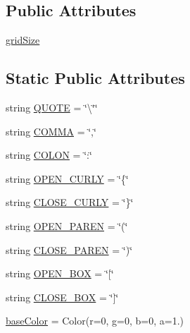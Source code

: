 \subsection*{Public Attributes}
\begin{DoxyCompactItemize}
\item 
\mbox{\hyperlink{class_bridges_1_1color__grid_1_1_color_grid_aabd8053e5acb920c28e519cd1ee69c35}{grid\+Size}}
\end{DoxyCompactItemize}
\subsection*{Static Public Attributes}
\begin{DoxyCompactItemize}
\item 
string \mbox{\hyperlink{class_bridges_1_1color__grid_1_1_color_grid_a1db881c79ab55a95c4c15dee31a1e431}{Q\+U\+O\+TE}} = \char`\"{}\textbackslash{}\char`\"{}\char`\"{}
\item 
string \mbox{\hyperlink{class_bridges_1_1color__grid_1_1_color_grid_af280f63885bffee3d3b6ecf0695844fc}{C\+O\+M\+MA}} = \char`\"{},\char`\"{}
\item 
string \mbox{\hyperlink{class_bridges_1_1color__grid_1_1_color_grid_a6185e36f338b56b33ff327afda157cf1}{C\+O\+L\+ON}} = \char`\"{}\+:\char`\"{}
\item 
string \mbox{\hyperlink{class_bridges_1_1color__grid_1_1_color_grid_a1f379a6c0e9fc4db2045e52678f15e20}{O\+P\+E\+N\+\_\+\+C\+U\+R\+LY}} = \char`\"{}\{\char`\"{}
\item 
string \mbox{\hyperlink{class_bridges_1_1color__grid_1_1_color_grid_a05c0cee0f9ca312db59a1d60e53845ba}{C\+L\+O\+S\+E\+\_\+\+C\+U\+R\+LY}} = \char`\"{}\}\char`\"{}
\item 
string \mbox{\hyperlink{class_bridges_1_1color__grid_1_1_color_grid_abde748d9ceae5339a3724b7064eee054}{O\+P\+E\+N\+\_\+\+P\+A\+R\+EN}} = \char`\"{}(\char`\"{}
\item 
string \mbox{\hyperlink{class_bridges_1_1color__grid_1_1_color_grid_afed081c42ad44319664d72567ee1b9ba}{C\+L\+O\+S\+E\+\_\+\+P\+A\+R\+EN}} = \char`\"{})\char`\"{}
\item 
string \mbox{\hyperlink{class_bridges_1_1color__grid_1_1_color_grid_a33869db1b3658c232827a2a0bc6e7170}{O\+P\+E\+N\+\_\+\+B\+OX}} = \char`\"{}\mbox{[}\char`\"{}
\item 
string \mbox{\hyperlink{class_bridges_1_1color__grid_1_1_color_grid_a9dcd6e3ce6c70a78216615edb35ec00e}{C\+L\+O\+S\+E\+\_\+\+B\+OX}} = \char`\"{}\mbox{]}\char`\"{}
\item 
\mbox{\hyperlink{class_bridges_1_1color__grid_1_1_color_grid_a97e66f3c97bbf57c2aa2f5fb78c4114f}{base\+Color}} = Color(r=0, g=0, b=0, a=1.)
\end{DoxyCompactItemize}



